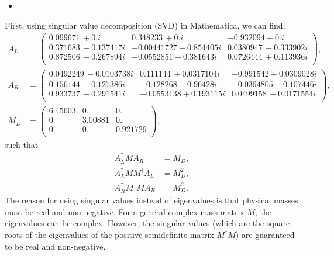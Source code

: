 \answer{}
\begin{itemize}
    \item [(a)]
\end{itemize}
First, using singular value decomposition (SVD) in Mathematica, we can find: 
\begin{align}
    A_L &=\begin{pmatrix}
        0.099671\, +0. i & 0.348233\, +0. i & -0.932094+0. i \\
        0.371683\, -0.137417 i & -0.00441727-0.854405 i & 0.0380947\, -0.333902 i \\
        0.872506\, -0.267894 i & -0.0552851+0.381643 i & 0.0726444\, +0.113936 i \\
        \end{pmatrix},\\
    A_R &= \begin{pmatrix}
        0.0492249\, -0.0103738 i & 0.111144\, +0.0317104 i & -0.991542+0.0309028 i \\
        0.156144\, -0.127386 i & -0.128268-0.96428 i & -0.0394805-0.107446 i \\
        0.933737\, -0.291541 i & -0.0553138+0.193115 i & 0.0499158\, +0.0171554 i \\
    \end{pmatrix},\\
    M_D&=\begin{pmatrix}
        6.45603 & 0. & 0. \\
        0. & 3.00881 & 0. \\
        0. & 0. & 0.921729 \\
    \end{pmatrix},
\end{align}
such that 
\begin{align}
    A_L^\dagger M A_R&=M_D,\\
    A_L^\dagger M M^\dagger A_L&=M_D^2,\\
    A_R^\dagger M^\dagger M A_R&=M_D^2.
\end{align}
The reason for using singular values instead of eigenvalues is that physical masses must be real and non-negative. For a general complex mass matrix $M$, the eigenvalues can be complex. However, the singular values (which are the square roots of the eigenvalues of the positive-semidefinite matrix $M^\dagger M$) are guaranteed to be real and non-negative.

